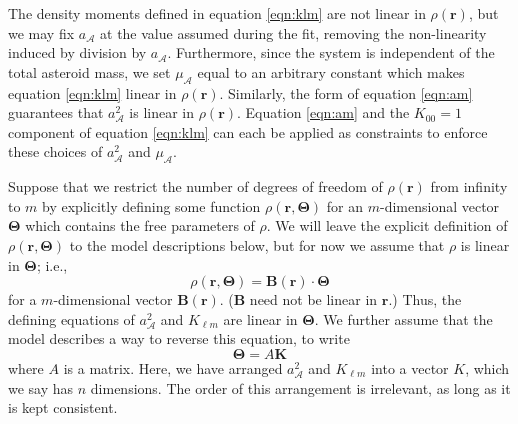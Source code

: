 \documentclass[fleqn,usenatbib]{mnras}
\begin{document}
The density moments defined in equation \ref{eqn:klm} are not linear in $\rho(\bm r)$, but we may fix $a_\mathcal{A}$ at the value assumed during the fit, removing the non-linearity induced by division by $a_\mathcal{A}$. Furthermore, since the system is independent of the total asteroid mass, we set $\mu_\mathcal{A}$ equal to an arbitrary constant which makes equation \ref{eqn:klm} linear in $\rho(\bm r)$. Similarly, the form of equation \ref{eqn:am} guarantees that $a_\mathcal{A}^2$ is linear in $\rho(\bm r)$. Equation \ref{eqn:am} and the $K_{00}=1$ component of equation \ref{eqn:klm} can each be applied as constraints to enforce these choices of $a_\mathcal{A}^2$ and $\mu_\mathcal{A}$.

Suppose that we restrict the number of degrees of freedom of $\rho(\bm r)$ from infinity to $m$ by explicitly defining some function $\rho(\bm r, \bm \Theta)$ for an $m$-dimensional vector $\bm \Theta$ which contains the free parameters of $\rho$. We will leave the explicit definition of $\rho(\bm r, \bm \Theta)$ to the model descriptions below, but for now we assume that $\rho$ is linear in $\bm \Theta$; i.e.,
\begin{equation}
  \rho(\bm r, \bm \Theta) = \bm B(\bm r) \cdot \bm \Theta
  \label{eqn:density-distro}
\end{equation}
for a $m$-dimensional vector $\bm B(\bm r)$. ($\bm B$ need not be linear in $\bm r$.) Thus, the defining equations of $a_\mathcal{A}^2$ and $K_{\ell m}$ are linear in $\bm \Theta$. We further assume that the model describes a way to reverse this equation, to write
\begin{equation}
  \bm \Theta = A \bm K
  \label{eqn:density-model}
\end{equation}
where $A$ is a matrix. Here, we have arranged $a_\mathcal{A}^2$ and $K_{\ell m}$ into a vector $K$, which we say has $n$ dimensions. The order of this arrangement is irrelevant, as long as it is kept consistent.
\end{document}
